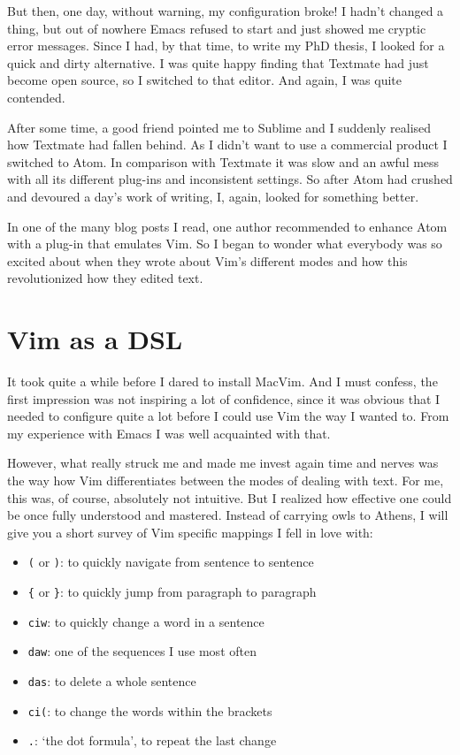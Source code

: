 \documentclass[DIV=calc, a4paper, fontsize=12pt, headings=normal, parskip=half]{scrartcl}
\begin{document}
But then, one day, without warning, my configuration broke! I hadn't
changed a thing, but out of nowhere Emacs refused to start and just
showed me cryptic error messages. Since I had, by that time, to write my
PhD thesis, I looked for a quick and dirty alternative. I was quite
happy finding that Textmate had just become open source, so I switched
to that editor. And again, I was quite contended.

After some time, a good friend pointed me to Sublime and I suddenly
realised how Textmate had fallen behind. As I didn't want to use a
commercial product I switched to Atom. In comparison with Textmate it
was slow and an awful mess with all its different plug-ins and
inconsistent settings. So after Atom had crushed and devoured a day's
work of writing, I, again, looked for something better.

In one of the many blog posts I read, one author recommended to enhance
Atom with a plug-in that emulates Vim. So I began to wonder what
everybody was so excited about when they wrote about Vim's different
modes and how this revolutionized how they edited text.

\section{Vim as a DSL}\label{vim-as-a-dsl}

It took quite a while before I dared to install MacVim. And I must
confess, the first impression was not inspiring a lot of confidence,
since it was obvious that I needed to configure quite a lot before I
could use Vim the way I wanted to. From my experience with Emacs I was
well acquainted with that.

However, what really struck me and made me invest again time and nerves
was the way how Vim differentiates between the modes of dealing with
text. For me, this was, of course, absolutely not intuitive. But I
realized how effective one could be once fully understood and mastered.
Instead of carrying owls to Athens, I will give you a short survey of
Vim specific mappings I fell in love with:

\begin{itemize}[noitemsep]
\item
  \texttt{(} or \texttt{)}: to quickly navigate from sentence to
  sentence
\item
  \texttt{\{} or \texttt{\}}: to quickly jump from paragraph to
  paragraph
\item
  \texttt{ciw}: to quickly change a word in a sentence
\item
  \texttt{daw}: one of the sequences I use most often
\item
  \texttt{das}: to delete a whole sentence
\item
  \texttt{ci(}: to change the words within the brackets
\item
  \texttt{.}: `the dot formula', to repeat the last change
\end{itemize}
\end{document}
